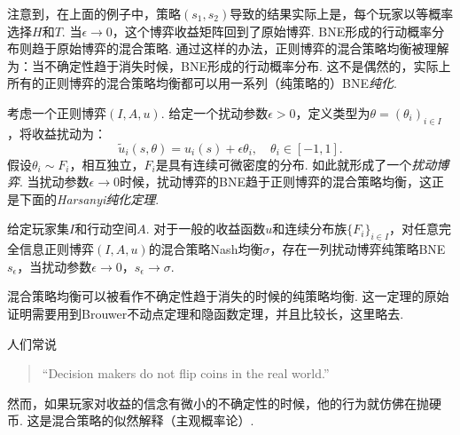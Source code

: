 注意到，在上面的例子中，策略$(s_1,s_2)$导致的结果实际上是，每个玩家以等概率选择$H$和$T$. 当$\epsilon\to 0$，这个博弈收益矩阵回到了原始博弈. BNE形成的行动概率分布则趋于原始博弈的混合策略. 通过这样的办法，正则博弈的混合策略均衡被理解为：当不确定性趋于消失时候，BNE形成的行动概率分布. 这不是偶然的，实际上所有的正则博弈的混合策略均衡都可以用一系列（纯策略的）BNE\emph{纯化}.

考虑一个正则博弈$(I,A,u)$. 给定一个扰动参数$\epsilon>0$，定义类型为$\theta=(\theta_i)_{i\in I}$，将收益扰动为：
\[\tilde u_i(s,\theta)=u_i(s)+\epsilon\theta_i,\quad\theta_i\in[-1,1].\]
假设$\theta_i\sim F_i$，相互独立，$F_i$是具有连续可微密度的分布. 如此就形成了一个\emph{扰动博弈}. 当扰动参数$\epsilon\to 0$时候，扰动博弈的BNE趋于正则博弈的混合策略均衡，这正是下面的\emph{Harsanyi纯化定理}. 

\begin{theorem}[Harsanyi纯化定理]\label{thm:har}
给定玩家集$I$和行动空间$A$. 对于一般的收益函数$u$和连续分布族$\{F_i\}_{i\in I}$，对任意完全信息正则博弈$(I,A,u)$的混合策略Nash均衡$\sigma$，存在一列扰动博弈纯策略BNE $s_\epsilon$，当扰动参数$\epsilon\to 0$，$s_\epsilon\to \sigma$.
\end{theorem}
混合策略均衡可以被看作不确定性趋于消失的时候的纯策略均衡. 这一定理的原始证明需要用到Brouwer不动点定理和隐函数定理，并且比较长，这里略去.

人们常说
\begin{quotation}
``Decision makers do not flip coins in the real world.''
\end{quotation}

然而，如果玩家对收益的信念有微小的不确定性的时候，他的行为就仿佛在抛硬币. 这是混合策略的似然解释（主观概率论）.

